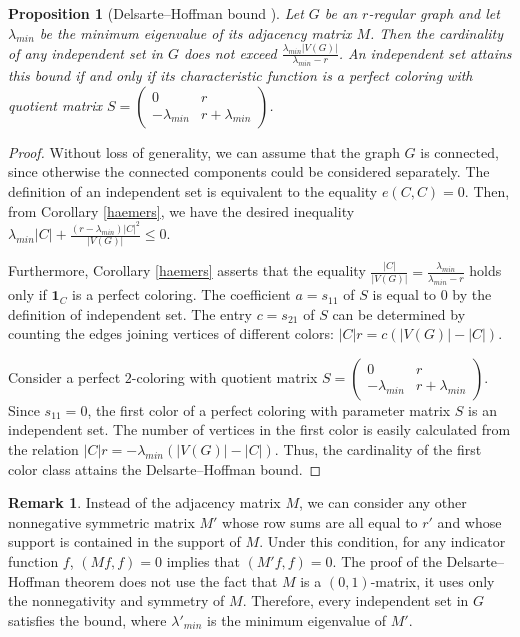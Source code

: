 \documentclass[11pt]{article}
\newtheorem{claim}{Proposition}[section]
\theoremstyle{definition}
\newtheorem{remark}{Remark}[section]
\begin{document}
\begin{claim}[Delsarte--Hoffman bound \cite{Hoff}]\label{PCclaim11}
Let $G$ be an $r$-regular graph and let $\lambda_{min}$ be the minimum eigenvalue of its
adjacency matrix $M$. Then the cardinality of any independent
set in $G$ does not exceed
$\frac{\lambda_{min}|V(G)|}{\lambda_{min}-r}$. 
An independent set attains this bound if and only if its characteristic function is a perfect coloring with quotient matrix
 $S=\begin{pmatrix}
0 & r \\
-\lambda_{min} & r+\lambda_{min}
\end{pmatrix}$.
\end{claim}
\begin{proof}
Without loss of generality, we can assume that the graph $G$ is connected,
since otherwise the connected components could
be considered separately. The definition of an independent set
is equivalent to the equality $e(C,C)=0$. Then, from Corollary \ref{haemers}, we have the desired inequality $
\lambda_{min}|C|+\frac{(r-\lambda_{min})|C|^2}{|V(G)|}\leq 0.$

Furthermore, Corollary \ref{haemers} asserts that the equality
$\frac{|C|}{|V(G)|}=\frac{\lambda_{min}}{\lambda_{min}-r}$ holds
only if ${\mathbf 1}_{C}$ is a perfect coloring. The coefficient $a=s_{11}$ of  $S$ is equal to $0$ by the definition of independent set.
The entry $c=s_{21}$ of  $S$ can be determined by counting the edges joining vertices of different colors:
 $|C|r=c(|V(G)|-|C|)$.

Consider a perfect $2$-coloring with quotient matrix $S=\begin{pmatrix}
0 & r \\
-\lambda_{min} & r+\lambda_{min}
\end{pmatrix}$.
Since $s_{11}=0$, the first color of a perfect coloring with parameter matrix $S$ is an independent set. The number of vertices in the first
color is easily calculated from the relation $|C|r=-\lambda_{min}
(|V(G)|-|C|)$.
Thus, the cardinality of the first color class attains the Delsarte--Hoffman bound.
 \end{proof}

\begin{remark} Instead of the  adjacency matrix $M$, we can consider any other
nonnegative symmetric matrix $M'$ whose row sums are all equal to  $r'$ 
and whose support is contained in the support of $M$. Under this condition, for any indicator function $f$, $(Mf,f)=0$ implies that $(M'f,f)=0$.
The proof of the Delsarte--Hoffman theorem does not use the fact that $M$ is a  $(0,1)$-matrix, it uses  only the nonnegativity
and symmetry of  $M$. Therefore, every independent set in $G$ satisfies 
the  bound, where $\lambda'_{min}$
is the minimum eigenvalue of $M'$.
\end{remark}
\end{document}
